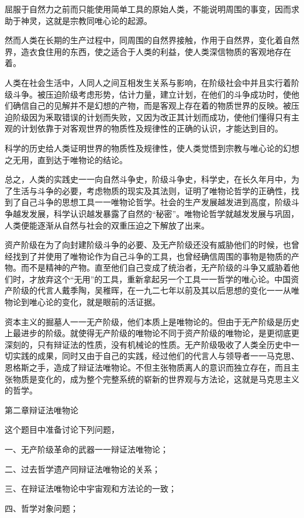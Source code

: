 屈服于自然力之前而只能使用简单工具的原始人类，不能说明周围的事变，因而求助于神灵，这就是宗教同唯心论的起源。

然而人类在长期的生产过程中，同周围的自然界接触，作用于自然界，变化着自然界，造衣食住用的东西，使之适合于人类的利益，使人类深信物质的客观地存在着。

人类在社会生活中，人同人之间互相发生关系与影响，在阶级社会中并且实行着阶级斗争。被压迫阶级考虑形势，估计力量，建立计划，在他们的斗争成功时，使他们确信自己的见解并不是幻想的产物，而是客观上存在着的物质世界的反映。被压迫阶级因为釆取错误的计划而失败，又因为改正其计划而成功，使他们懂得只有主观的计划依靠于对客观世界的物质性及规律性的正确的认识，才能达到目的。

科学的历史给人类证明世界的物质性及规律性，使人类觉悟到宗教与唯心论的幻想之无用，直到达于唯物论的结论。

总之，人类的实践史一一向自然斗争史，阶级斗争史，科学史，在长久年月中，为了生活与斗争的必要，考虑物质的现实及其法则，证明了唯物论哲学的正确性，找到了自己斗争的思想工具一一唯物论哲学。社会的生产发展越发进到高度，阶级斗争越发发展，科学认识越发暴露了自然的“秘密”。唯物论哲学就越发发展与巩固，人类便能逐渐从自然与社会的双重压迫之下解放了出来。

资产阶级在为了向封建阶级斗争的必要、及无产阶级还没有威胁他们的时候，也曾经找到了并使用了唯物论作为自己斗争的工具，也曾经确信周围的事物是物质的产物。而不是精神的产物。直至他们自己变成了统治者，无产阶级的斗争又威胁着他们时，才放弃这个“无用”的工具，重新拿起另一个工具一一哲学的唯心论。中国资产阶级的代言人戴季陶，吴稚晖，在一九二七年以前及其以后思想的变化一一从唯物论到唯心论的变化，就是眼前的活证据。

资本主义的掘墓人一一无产阶级，他们本质上是唯物论的。但由于无产阶级是历史上最进步的阶级。就使得无产阶级的唯物论不同于资产阶级的唯物论，是更彻底更深刻的，只有辩证法的性质，没有机械论的性质。无产阶级吸收了人类全历史中一切实践的成果，同时又由于自己的实践，经过他们的代言人与领导者一一马克思、恩格斯之手，造成了辩证法唯物论。不但主张物质离人的意识而独立存在，而且主张物质是变化的，成为整个完整系统的崭新的世界观与方法论，这就是马克思主义的哲学。

第二章辩证法唯物论

这个题目中准备讨论下列问题，

一、无产阶级革命的武器一一辩证法唯物论；

二、过去哲学遗产同辩证法唯物论的关系；

三、在辩证法唯物论中宇宙观和方法论的一致；

四、哲学对象问题；

